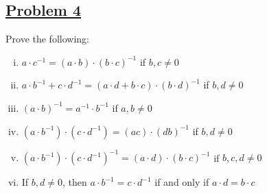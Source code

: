 \documentclass[10pt,letterpaper]{article}
\begin{document}
	\subsection*{{\color{purple}\underline{Problem 4}}}
	Prove the following:
	\begin{enumerate}[(i)]
	\item $a \cdot c^{-1} = (a \cdot b) \cdot (b \cdot c)^{-1}$ if $b, c \neq 0$ 
	\item $a \cdot b^{-1} + c \cdot d^{-1} = (a \cdot d + b \cdot c) \cdot (b \cdot d)^{-1}$ if $b, d \neq 0$ 
	\item $(a \cdot b)^{-1} = a^{-1} \cdot b^{-1}$ if $a, b \neq 0$ 
	\item $ (a \cdot b^{-1}) \cdot (c \cdot d^{-1}) = (ac) \cdot (db)^{-1}$ if $b, d \neq 0$
	\item $(a \cdot b^{-1}) \cdot (c \cdot d^{-1})^{-1} = (a \cdot d) \cdot (b \cdot c)^{-1}$ if $b, c, d \neq 0$
	\item If $b, d \neq 0$, then $a \cdot b^{-1} = c \cdot d^{-1}$ if and only if $a \cdot d = b \cdot c$
	\end{enumerate}
\end{document}
